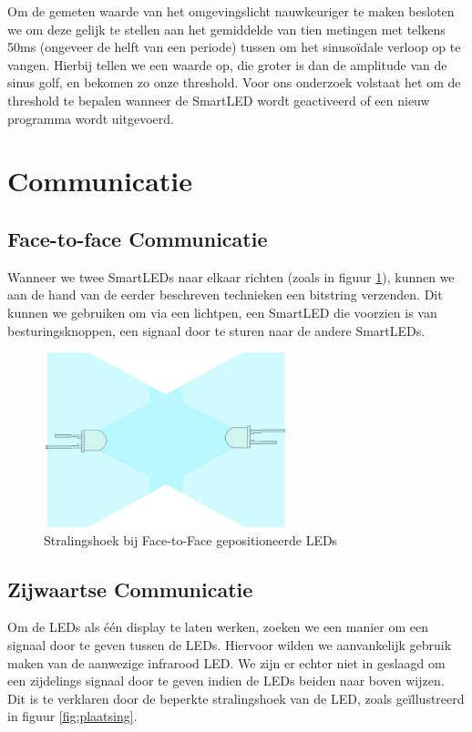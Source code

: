 \documentclass{article}
\begin{document}
Om de gemeten waarde van het omgevingslicht nauwkeuriger te maken besloten we om deze gelijk te stellen aan het gemiddelde van tien metingen met telkens 50ms (ongeveer de helft van een periode) tussen om het sinuso\"idale verloop op te vangen. Hierbij tellen we een waarde op, die groter is dan de amplitude van de sinus golf, en bekomen zo onze threshold. 
Voor ons onderzoek volstaat het om de threshold te bepalen wanneer de SmartLED wordt geactiveerd of een nieuw programma wordt uitgevoerd.

\section{Communicatie}\label{communicatie}
\subsection{Face-to-face Communicatie}
Wanneer we twee SmartLEDs naar elkaar richten (zoals in figuur \ref{fig:plaatsingFace}), kunnen we aan de hand van de eerder beschreven technieken een bitstring verzenden. Dit kunnen we gebruiken om via een lichtpen, een SmartLED die voorzien is van besturingsknoppen, een signaal door te sturen naar de andere SmartLEDs. 

\begin{figure}
\centering
\includegraphics[width=7cm]{LedTegenoverElkaar.png}
\caption{Stralingshoek bij Face-to-Face gepositioneerde LEDs}
\label{fig:plaatsingFace}
\end{figure}

\subsection{Zijwaartse Communicatie}
Om de LEDs als \'e\'en display te laten werken, zoeken we een manier om een signaal door te geven tussen de LEDs. Hiervoor wilden we aanvankelijk gebruik maken van de aanwezige infrarood LED. We zijn er echter niet in geslaagd om een zijdelings signaal door te geven indien de LEDs beiden naar boven wijzen. Dit is te verklaren door de beperkte stralingshoek van de LED, zoals ge\"illustreerd in figuur \ref{fig:plaatsing}.
\end{document}
